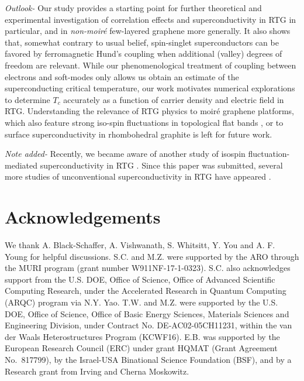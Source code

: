 \documentclass[aps,pra,twocolumn,superscriptaddress,10pt,article,nofootinbib,showpacs,longbibliography]{revtex4-1}
\begin{document}
\emph{Outlook-}
Our study provides a starting point for further theoretical and experimental investigation of correlation effects and superconductivity in RTG in particular, and in \textit{non-moir\'e} few-layered graphene more generally.
It also shows that, somewhat contrary to usual belief, spin-singlet superconductors can be favored by ferromagnetic Hund's coupling when additional (valley) degrees of freedom are relevant. 
While our phenomenological treatment of coupling between electrons and soft-modes only allows us obtain an estimate of the superconducting critical temperature, our work motivates numerical explorations to determine $T_c$ accurately as a function of carrier density and electric field in RTG. 
Understanding the relevance of RTG physics to moir\'e graphene platforms, which also feature strong iso-spin fluctuations in topological flat bands \cite{Saito2021,Zondiner2020,NickPRX,Khalaf2020}, or to surface superconductivity in rhombohedral graphite \cite{Kopnin,Kopnin2} is left for future work.


\emph{Note added-} Recently, we became aware of another study of isospin fluctuation-mediated superconductivity in RTG \cite{Levitov}. Since this paper was submitted, several more studies of unconventional superconductivity in RTG have appeared \cite{Guinea,Roy,Yizhuang}.


\section*{Acknowledgements} 
We thank A. Black-Schaffer, A. Vishwanath, S. Whitsitt, Y. You and A. F. Young for helpful discussions.
S.C. and M.Z. were supported by the ARO through the MURI program (grant number W911NF-17-1-0323). S.C. also acknowledges support from the U.S. DOE, Office of Science, Office of Advanced Scientific Computing Research, under the Accelerated Research in Quantum Computing (ARQC) program via N.Y. Yao.
T.W. and M.Z. were supported by the U.S. DOE, Office of Science, Office of Basic Energy Sciences, Materials Sciences and Engineering Division, under Contract No. DE-AC02-05CH11231, within the van der Waals Heterostructures Program (KCWF16).
E.B. was supported by the European Research Council (ERC) under grant HQMAT (Grant Agreement No.~817799), by the Israel-USA Binational Science Foundation (BSF), and by a Research grant from Irving and Cherna Moskowitz.





\newpage
\appendix
\onecolumngrid
\end{document}
